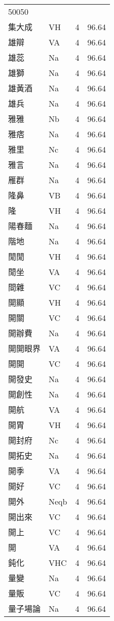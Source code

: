 \documentclass[twocolumn]{book}
\begin{document}
\begin{supertabular}{llrr}
50050\\
集大成 & VH & 4 &  96.64\\
雄辯 & VA & 4 &  96.64\\
雄蕊 & Na & 4 &  96.64\\
雄獅 & Na & 4 &  96.64\\
雄黃酒 & Na & 4 &  96.64\\
雄兵 & Na & 4 &  96.64\\
雅雅 & Nb & 4 &  96.64\\
雅痞 & Na & 4 &  96.64\\
雅里 & Nc & 4 &  96.64\\
雅言 & Na & 4 &  96.64\\
雁群 & Na & 4 &  96.64\\
隆鼻 & VB & 4 &  96.64\\
隆 & VH & 4 &  96.64\\
陽春麵 & Na & 4 &  96.64\\
階地 & Na & 4 &  96.64\\
閒閒 & VH & 4 &  96.64\\
閒坐 & VA & 4 &  96.64\\
間雜 & VC & 4 &  96.64\\
開顯 & VH & 4 &  96.64\\
開關 & VC & 4 &  96.64\\
開辦費 & Na & 4 &  96.64\\
開開眼界 & VA & 4 &  96.64\\
開開 & VC & 4 &  96.64\\
開發史 & Na & 4 &  96.64\\
開創性 & Na & 4 &  96.64\\
開航 & VA & 4 &  96.64\\
開胃 & VH & 4 &  96.64\\
開封府 & Nc & 4 &  96.64\\
開拓史 & Na & 4 &  96.64\\
開季 & VA & 4 &  96.64\\
開好 & VC & 4 &  96.64\\
開外 & Neqb & 4 &  96.64\\
開出來 & VC & 4 &  96.64\\
開上 & VC & 4 &  96.64\\
開 & VA & 4 &  96.64\\
鈍化 & VHC & 4 &  96.64\\
量變 & Na & 4 &  96.64\\
量販 & VC & 4 &  96.64\\
量子場論 & Na & 4 &  96.64\\

\end{supertabular}
\end{document}

